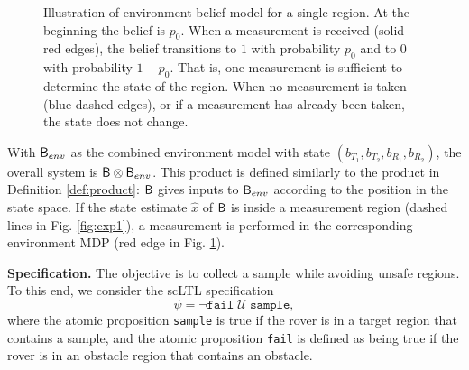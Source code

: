 \documentclass{ifacconf}
\begin{document}
\begin{figure}
  \begin{center}
  \end{center}
  \caption{Illustration of environment belief model for a single region. At the beginning the belief is $p_0$. When a measurement is received (solid red edges), the belief transitions to $1$ with probability $p_0$ and to $0$ with probability $1-p_0$. That is, one measurement is sufficient to determine the state of the region. When no measurement is taken (blue dashed edges), or if a measurement has already been taken, the state does not change.}
  \label{fig:envmdp}
\end{figure}

With $\mathsf{B}_{env}$ as the combined environment model with state $(b_{T_1}, b_{T_2}, b_{R_1}, b_{R_2})$, the overall system is $\mathsf{B} \otimes \mathsf{B}_{env}$. This product is defined similarly to the product in Definition \ref{def:product}: $\mathsf{B}$ gives inputs to $\mathsf{B}_{env}$ according to the position in the state space. If the state estimate $\hat x$ of $\mathsf{B}$ is inside a measurement region (dashed lines in Fig. \ref{fig:exp1}), a measurement is performed in the corresponding environment MDP (red edge in Fig. \ref{fig:envmdp}).


\textbf{Specification.} The objective is to collect a sample while avoiding unsafe regions. To this end, we consider the scLTL specification
\begin{equation}
  \psi =\lnot \texttt{fail} \; \mathcal {U} \; \texttt{sample},
\end{equation}
where the atomic proposition \texttt{sample} is true if the rover is in a target region that contains a sample, and the atomic proposition \texttt{fail} is defined as being true if the rover is in an obstacle region that contains an obstacle.
\end{document}
